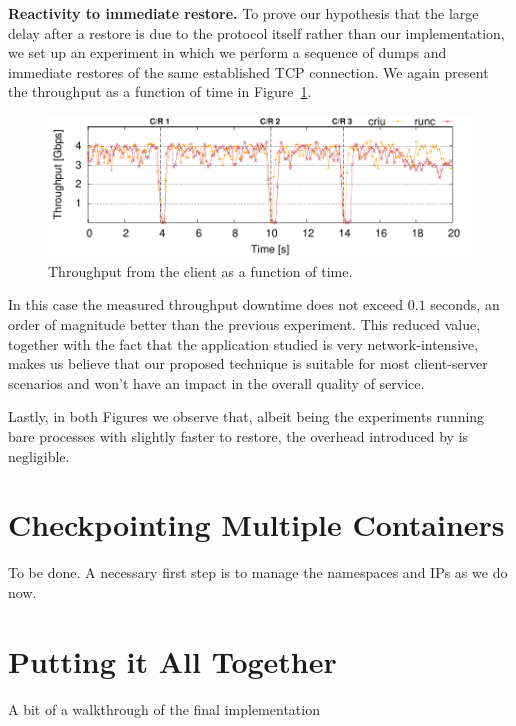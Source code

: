 \textbf{Reactivity to immediate restore.}
To prove our hypothesis that the large delay after a restore is due to the protocol itself rather than our implementation, we set up an experiment in which we perform a sequence of dumps and immediate restores of the same established TCP connection.
We again present the throughput as a function of time in Figure~\ref{fig:evaluation-reactivity}.
\begin{figure}[h!]
    \centering
    \includegraphics[width=\linewidth]{./figs/tcp-established-resolution/tcp_established_resolution_microbenchmark.pdf}
    \caption{Throughput from the client as a function of time.\label{fig:evaluation-reactivity}}
\end{figure}
In this case the measured throughput downtime does not exceed $0.1$ seconds, an order of magnitude better than the previous experiment.
This reduced value, together with the fact that the application studied is very network-intensive, makes us believe that our proposed technique is suitable for most client-server scenarios and won't have an impact in the overall quality of service.

Lastly, in both Figures we observe that, albeit being the experiments running bare processes with \criu slightly faster to restore, the overhead introduced by \runc is negligible.

\section{Checkpointing Multiple Containers}

To be done.
A necessary first step is to manage the namespaces and IPs as we do now.

\section{Putting it All Together}

A bit of a walkthrough of the final implementation
